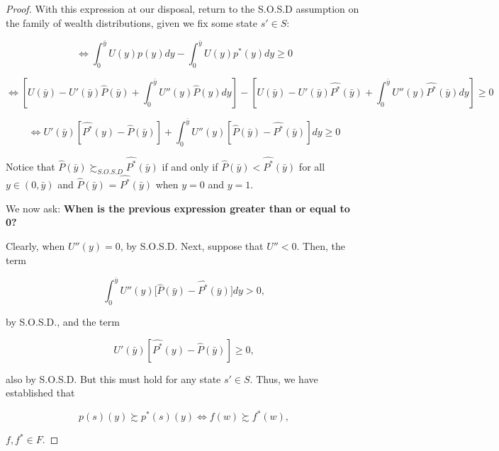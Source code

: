 \documentclass[\econtexRoot/Preproposal]{subfiles}
\begin{document}
\begin{proof}
	\par With this expression at our disposal, return to the S.O.S.D assumption on the family of wealth distributions, given we fix some state $s' \in S$:
	
$$ \iff \int_{0}^{\bar{y}} U(y)p(y) dy - \int_{0}^{\bar{y}} U(y)p^*(y) dy  \geq 0 $$	

$$ \iff [ U(\bar{y}) - U'(\bar{y}) \hat{P}(\bar{y}) + \int_{0}^{\bar{y}} U''(y) \hat{P}(y) dy ] - [ U(\bar{y}) - U'(\bar{y}) \hat{P^{*}}(\bar{y}) + \int_{0}^{\bar{y}} U''(y) \hat{P^{*}}(\bar{y}) dy ]  \geq 0$$

$$ \iff U'(\bar{y})[\hat{P^{*}}(y) -\hat{P}(\bar{y})] + \int_{0}^{\bar{y}} U''(y) [  \hat{P}(\bar{y}) - \hat{P^{*}}(\bar{y}) ] dy \geq 0$$	

\par Notice that $\hat{P}(\bar{y})\succsim_{S.O.S.D} \hat{P^{*}}(\bar{y}) $ if and only if $\hat{P}(\bar{y}) < \hat{P^{*}}(\bar{y}) $ for all $y \in (0, \bar{y})$ and $\hat{P}(\bar{y})$ = $\hat{P^{*}}(\bar{y})$ when $y=0$ and $y=1$.

\par We now ask: \textbf{When is the previous expression greater than or equal to 0?}

\par Clearly, when $U''(y) =0$, by S.O.S.D. Next, suppose that $U'' < 0$. Then, the term
	
$$ \int_{0}^{\bar{y}} U''(y)\bigg[  \hat{P}(\bar{y}) - \hat{P^{*}}(\bar{y}) \bigg] dy > 0,$$	
	
\par by S.O.S.D., and the term
	
$$  U'(\bar{y})[\hat{P^{*}}(y) -\hat{P}(\bar{y})] \geq 0,$$

	\par also by S.O.S.D. But this must hold for any state $s' \in S$. Thus, we have established that
	
$$ p(s)(y) \succsim p^{*}(s)(y) \iff f(w) \succsim f^{*}(w),$$

	\par $f,f^{*} \in F.$	 	


\end{proof}
\end{document}
